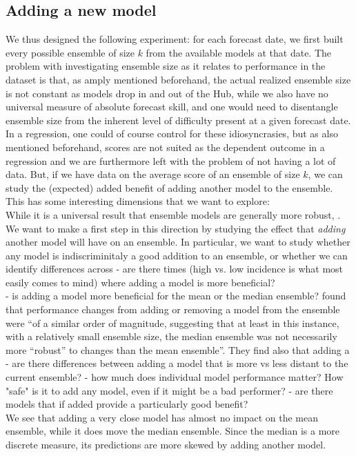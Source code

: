 \subsection{Adding a new model} \label{sub:adding_a_new_model}
We thus designed the following experiment: for each forecast date, we first built every possible ensemble of size $k$ from the available models at that date. The problem with investigating ensemble size as it relates to performance in the dataset is that, as amply mentioned beforehand, the actual realized ensemble size is not constant as models drop in and out of the Hub, while we also have no universal measure of absolute forecast skill, and one would need to disentangle ensemble size from the inherent level of difficulty present at a given forecast date. In a regression, one could of course control for these idiosyncrasies, but as also mentioned beforehand, scores are not suited as the dependent outcome in a regression and we are furthermore left with the problem of not having a lot of data. But, if we have data on the average score of an ensemble of size $k$, we can study the (expected) added benefit of adding another model to the ensemble. This has some interesting dimensions that we want to explore:\\
While it is a universal result that ensemble models are generally more robust, . We want to make a first step in this direction by studying the effect that \textit{adding} another model will have on an ensemble. In particular, we want to study whether any model is indiscriminitaly a good addition to an ensemble, or whether we can identify differences across 
- are there times (high vs. low incidence is what most easily comes to mind) where adding a model is more beneficial?\\
- is adding a model more beneficial for the mean or the median ensemble? \cite{bosse_comparing_2021-1} found that performance changes from adding or removing a model from the ensemble were ``of a similar order of magnitude, suggesting that at least in this instance, with a relatively small ensemble size, the median ensemble was not necessarily more ``robust'' to changes than the mean ensemble''. They find also that adding a 
- are there differences between adding a model that is more vs less distant to the current ensemble?
- how much does individual model performance matter? How "safe" is it to add any model, even if it might be a bad performer?  
- are there models that if added provide a particularly good benefit?\\
We see that adding a very close model has almost no impact on the mean ensemble, while it does move the median ensemble. Since the median is a more discrete measure, its predictions are more skewed by adding another model. \\
